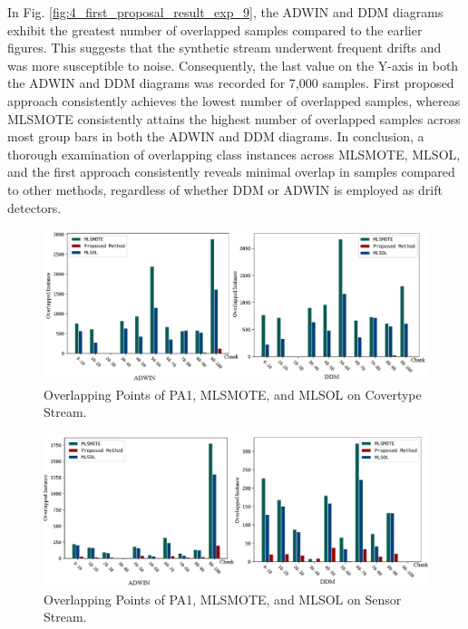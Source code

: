 In Fig. \ref{fig:4_first_proposal_result_exp_9}, the ADWIN and DDM diagrams exhibit the greatest number of overlapped samples compared to the earlier figures. This suggests that the synthetic stream underwent frequent drifts and was more susceptible to noise. Consequently, the last value on the Y-axis in both the ADWIN and DDM diagrams was recorded for 7,000 samples. First proposed approach consistently achieves the lowest number of overlapped samples, whereas MLSMOTE consistently attains the highest number of overlapped samples across most group bars in both the ADWIN and DDM diagrams. In conclusion, a thorough examination of overlapping class instances across MLSMOTE, MLSOL, and the first approach consistently reveals minimal overlap in samples compared to other methods, regardless of whether DDM or ADWIN is employed as drift detectors.

\begin{figure}[!ht]
	\centering
	\includegraphics[width=1\linewidth]{4_Imbalanced/figures/exp_7.png}
  \caption{Overlapping Points of PA1, MLSMOTE, and MLSOL on Covertype Stream.}
	\label{fig:4_first_proposal_result_exp_7}
\end{figure}

\begin{figure}[!ht]
	\centering
	\includegraphics[width=1\linewidth]{4_Imbalanced/figures/exp_8.png}
  \caption{Overlapping Points of PA1, MLSMOTE, and MLSOL on Sensor Stream.}
	\label{fig:4_first_proposal_result_exp_8}
\end{figure}

